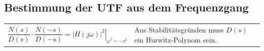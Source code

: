 \subsection{Bestimmung der UTF aus dem Frequenzgang }
  \begin{tabular}{p{6cm}p{12cm}}
    \vspace{-1.5\topsep}
    $\dfrac{N(s)}{D(s)} \cdot \dfrac{N(-s)}{D(-s)} = \left.|H(j\omega)|^2\right|_{\omega^2=-s^2}$ &
    Aus Stabilitätsgründen muss $D(s)$ ein Hurwitz-Polynom sein.
  \end{tabular}








